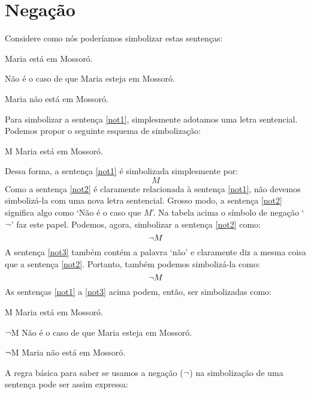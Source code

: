 \section{Negação}

Considere como nós poderíamos simbolizar estas sentenças:
	\begin{earg}
	\item[\ex{not1}] Maria está em Mossoró.
	\item[\ex{not2}] Não é o caso de que Maria esteja em Mossoró.
	\item[\ex{not3}] Maria não está em Mossoró.
	\end{earg}
Para simbolizar a sentença \ref{not1}, simplesmente adotamos uma letra sentencial.
Podemos propor o seguinte esquema de simbolização:
	\begin{ekey}
		\item[M] Maria está em Mossoró.
	\end{ekey}
Dessa forma, a sentença \ref{not1} é simbolizada simplesmente por:
$$M$$
Como a sentença \ref{not2} é claramente relacionada à sentença \ref{not1}, não devemos simbolizá-la com uma nova letra sentencial.
Grosso modo, a sentença \ref{not2} significa algo como `Não é o caso que $M$'.
Na tabela acima o símbolo de negação `$\neg$' faz este papel.
Podemos, agora, simbolizar a sentença \ref{not2} como:
$$\neg M$$
A sentença \ref{not3} também contém a palavra `não' e claramente diz a mesma coisa que a sentença \ref{not2}.
Portanto, também podemos simbolizá-la como:
$$\neg M$$
As sentenças \ref{not1} a \ref{not3} acima podem, então, ser simbolizadas como:
	\begin{ekey}
		\item[M] Maria está em Mossoró.
		\item[$\neg$M] Não é o caso de que Maria esteja em Mossoró.
		\item[$\neg$M] Maria não está em Mossoró.
	\end{ekey}
A regra básica para saber se usamos a negação ($\neg$) na simbolização de uma sentença pode ser assim expressa:

